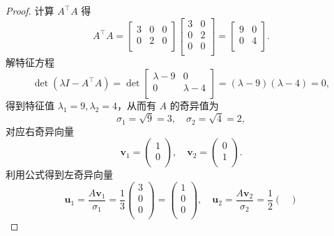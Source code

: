 \begin{proof}
    计算 $A^\top A$ 得
    \[
    A^\top A = \begin{bmatrix}
        3 & 0 & 0 \\
        0 & 2 & 0 \\
    \end{bmatrix} \begin{bmatrix}
        3 & 0 \\
        0 & 2 \\
        0 & 0 \\
    \end{bmatrix} = \begin{bmatrix}
        9 & 0 \\
        0 & 4 \\
    \end{bmatrix}.
    \]
    解特征方程 \[
    \det \left(\lambda I - A^\top A\right) = \det\begin{bmatrix}
        \lambda - 9 & 0 \\
        0 & \lambda - 4 \\
    \end{bmatrix} = \left(\lambda - 9\right)\left(\lambda - 4\right) = 0,
    \]
    得到特征值 $\lambda_1 = 9, \lambda_2 = 4$，从而有 $A$ 的奇异值为 \[
        \sigma_1 = \sqrt{9} = 3, \quad \sigma_2 = \sqrt{4} = 2,
    \]
    对应右奇异向量 \[
        \boldsymbol{v}_1 = \begin{pmatrix}
            1 \\
            0 \\
        \end{pmatrix}, \quad \boldsymbol{v}_2 = \begin{pmatrix}
            0 \\
            1 \\
        \end{pmatrix}.
    \]
    利用公式得到左奇异向量 \[
    \boldsymbol{u}_1 = \frac{A\boldsymbol{v}_1}{\sigma_1} = \frac{1}{3}\begin{pmatrix}
        3 \\
        0 \\
        0 \\
    \end{pmatrix} = \begin{pmatrix}
        1 \\
        0 \\
        0 \\
    \end{pmatrix}, \quad \boldsymbol{u}_2 = \frac{A\boldsymbol{v}_2}{\sigma_2} = \frac{1}{2}\begin{pmatrix}

\end{pmatrix}\]
\end{proof}
